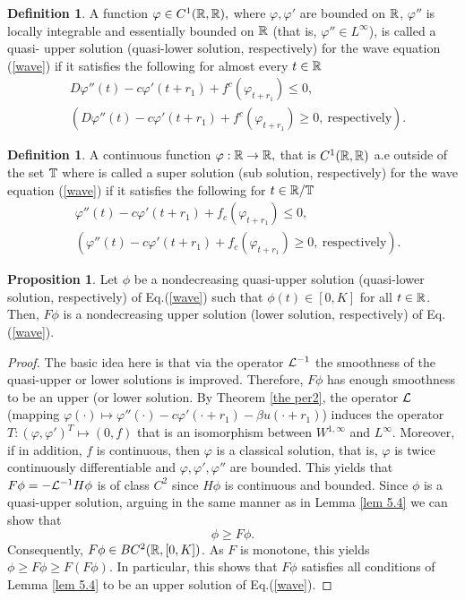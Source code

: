 \documentclass[12pt,letterpaper]{amsart}
\theoremstyle{definition}
\newtheorem{definition}[theorem]{Definition}
\newtheorem{proposition}[theorem]{Proposition}
\theoremstyle{remark}
\numberwithin{equation}{section}
\begin{document}
\begin{definition} A function $\varphi \in C^1(\R,\R),$ where $ \varphi, \varphi'$ are bounded on $\R$, $\varphi''$ is locally integrable and essentially bounded on $\R$ (that is, $\varphi''\in L^\infty$), is called a quasi- upper solution (quasi-lower solution, respectively) for the wave equation (\ref{wave}) if it satisfies the following for almost every $t\in \R$
\begin{align*}
& D\varphi''(t)-c\varphi'(t+r_1)+f^c(\varphi_{t+r_1})\le 0 , \\
& (D\varphi''(t)-c\varphi'(t+r_1)+f^c(\varphi_{t+r_1})\ge 0, \ \mbox{respectively}) .
\end{align*}
\end{definition}

\begin{definition}
A continuous function $\varphi:\r\to \R,$ that is  $C^1(\r,\r)$ a.e outside of the set $\T$  where  is called a super solution (sub solution, respectively) for the wave equation (\ref{wave}) if it satisfies the following for  $t\in \R/\T$
\begin{align*}
& \varphi''(t)-c\varphi'(t+r_1)+f_c(\varphi_{t+r_1})\le 0 , \\
& (\varphi''(t)-c\varphi'(t+r_1)+f_c(\varphi_{t+r_1})\ge 0, \ \mbox{respectively}) .
\end{align*}    
\end{definition}
\begin{proposition}\label{smoothprop1}
Let $\phi$ be a nondecreasing quasi-upper solution (quasi-lower solution, respectively) of Eq.(\ref{wave}) such that $\phi(t)\in [0,K]$ for all $t\in \R$. Then, $F\phi$ is a nondecreasing upper solution (lower solution, respectively) of Eq.(\ref{wave}).
\end{proposition}
\begin{proof}
The basic idea here is that via the operator ${\cal L}^{-1}$ the smoothness of the quasi-upper or lower solutions is improved. Therefore, $F\phi$ has enough smoothness to be an upper (or lower solution.
By Theorem \ref{the per2}, the operator  ${\cal L}$ (mapping $\varphi (\cdot )\mapsto \varphi''(\cdot )-c\varphi '(\cdot +r_1)-\beta u(\cdot +r_1)$) induces the operator $T: (\varphi , \varphi')^T\mapsto (0,f)$ that
is an isomorphism between $W^{1,\infty}$ and $L^\infty$. Moreover, if in addition, $f$ is continuous, then  
$\varphi$ is a classical solution, that is, $\varphi$ is twice continuously differentiable and $\varphi,\varphi',\varphi''$ are bounded. This yields that $F\phi =-{\cal L}^{-1}H\phi$ is of class $C^2$ since $H\phi$ is continuous and bounded.
Since $\phi$ is a quasi-upper solution, arguing in the same manner as in Lemma \ref{lem 5.4} we can show that
$$
\phi \ge F\phi .
$$
Consequently, $F\phi \in BC^2(\R,[0,K])$. As $F$ is monotone, this yields $\phi \ge F\phi \ge F(F\phi)$. In particular, this shows that $F\phi$ satisfies all conditions of Lemma \ref{lem 5.4} to be an upper solution of Eq.(\ref{wave}).
\end{proof}
\end{document}
